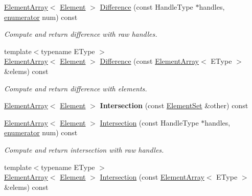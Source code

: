 \begin{DoxyCompactItemize}
\item 
\hyperlink{classINMOST_1_1ElementArray}{Element\-Array}$<$ \hyperlink{classINMOST_1_1Element}{Element} $>$ \hyperlink{classINMOST_1_1ElementSet_a4b7496ef3146d869c4b8db7ba378d152}{Difference} (const Handle\-Type $\ast$handles, \hyperlink{classINMOST_1_1Storage_ae333dfced6fa9cfde0c8e7dcf1b0cc2b}{enumerator} num) const 
\begin{DoxyCompactList}\small\item\em Compute and return difference with raw handles. \end{DoxyCompactList}\item 
\hypertarget{classINMOST_1_1ElementSet_af038e8851f02e9c4ae488a3ed1530bd7}{{\footnotesize template$<$typename E\-Type $>$ }\\\hyperlink{classINMOST_1_1ElementArray}{Element\-Array}$<$ \hyperlink{classINMOST_1_1Element}{Element} $>$ \hyperlink{classINMOST_1_1ElementSet_af038e8851f02e9c4ae488a3ed1530bd7}{Difference} (const \hyperlink{classINMOST_1_1ElementArray}{Element\-Array}$<$ E\-Type $>$ \&elems) const }\label{classINMOST_1_1ElementSet_af038e8851f02e9c4ae488a3ed1530bd7}

\begin{DoxyCompactList}\small\item\em Compute and return difference with elements. \end{DoxyCompactList}\item 
\hypertarget{classINMOST_1_1ElementSet_a9db0add67c5ca85db968f77bf7162e2c}{\hyperlink{classINMOST_1_1ElementArray}{Element\-Array}$<$ \hyperlink{classINMOST_1_1Element}{Element} $>$ {\bfseries Intersection} (const \hyperlink{classINMOST_1_1ElementSet}{Element\-Set} \&other) const }\label{classINMOST_1_1ElementSet_a9db0add67c5ca85db968f77bf7162e2c}

\item 
\hyperlink{classINMOST_1_1ElementArray}{Element\-Array}$<$ \hyperlink{classINMOST_1_1Element}{Element} $>$ \hyperlink{classINMOST_1_1ElementSet_a2afffba16c7c38cf23a6a0706af45d27}{Intersection} (const Handle\-Type $\ast$handles, \hyperlink{classINMOST_1_1Storage_ae333dfced6fa9cfde0c8e7dcf1b0cc2b}{enumerator} num) const 
\begin{DoxyCompactList}\small\item\em Compute and return intersection with raw handles. \end{DoxyCompactList}\item 
\hypertarget{classINMOST_1_1ElementSet_a9991abefdf4ecfdf35ee2d52eea650f1}{{\footnotesize template$<$typename E\-Type $>$ }\\\hyperlink{classINMOST_1_1ElementArray}{Element\-Array}$<$ \hyperlink{classINMOST_1_1Element}{Element} $>$ \hyperlink{classINMOST_1_1ElementSet_a9991abefdf4ecfdf35ee2d52eea650f1}{Intersection} (const \hyperlink{classINMOST_1_1ElementArray}{Element\-Array}$<$ E\-Type $>$ \&elems) const }\label{classINMOST_1_1ElementSet_a9991abefdf4ecfdf35ee2d52eea650f1}


\end{DoxyCompactItemize}
